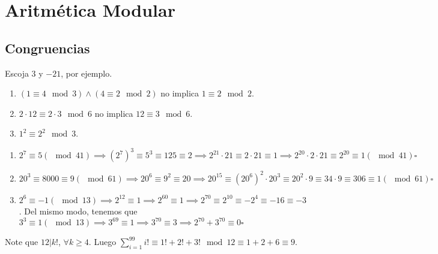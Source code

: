 \section{Aritm\'etica Modular}

\subsection{Congruencias}

\begin{sol}
	Escoja $3$ y $-21$, por ejemplo.
\end{sol}

\begin{sol}
	\begin{enumerate}
		\item $(1\equiv 4 \mod 3) \land (4\equiv 2 \mod 2) $ no implica $1\equiv 2 \mod 2$.
		\item $2\cdot 12 \equiv 2\cdot 3 \mod 6$ no implica $ 12\equiv 3 \mod 6$.
		\item $1^2 \equiv 2^2 \mod 3$.
	\end{enumerate}
\end{sol}

\begin{sol}
	
	\begin{enumerate}
		
		\item $2^7 \equiv 5 (\mod 41) \implies (2^7)^3 \equiv 5^3 \equiv 125 \equiv 2 \implies 2^{21}\cdot  21 \equiv 2\cdot21 \equiv 1 \implies 2^{20} \cdot2\cdot21 \equiv 2^{20} \equiv 1 (\mod 41) \square$
		\item $20^3 \equiv 8000 \equiv 9 (\mod 61) \implies  20^6 \equiv 9^2 \equiv 20 \implies 20^{15} \equiv (20^6)^2  \cdot 20^3  \equiv 20^2 \cdot 9 \equiv 34\cdot 9 \equiv 306 \equiv 1 (\mod 61) \square$
		\item $2^6 \equiv -1 (\mod 13) \implies 2^{12} \equiv 1 \implies 2^{60} \equiv 1 \implies 2^{70} \equiv 2^{10} \equiv -2^{4} \equiv -16 \equiv -3$. Del mismo modo, tenemos que $3^3 \equiv 1 (\mod 13) \implies 3^{69} \equiv 1 \implies 3^{70} \equiv 3 \implies 2^{70} + 3^{70} \equiv 0 \square$
	
	\end{enumerate}
\end{sol}

\begin{sol} %
	Note que $12|k!$, $\forall k\geq 4$. Luego $\sum_{i=1}^{99}i! \equiv 1!+2!+3! \mod 12 \equiv 1+2+6 \equiv 9$.
\end{sol}

